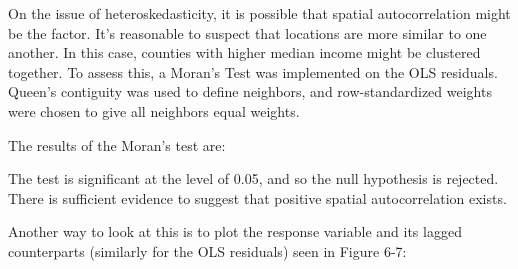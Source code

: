 \documentclass[
]{article}
\begin{document}
\newpage

On the issue of heteroskedasticity, it is possible that spatial
autocorrelation might be the factor. It's reasonable to suspect that
locations are more similar to one another. In this case, counties with
higher median income might be clustered together. To assess this, a
Moran's Test was implemented on the OLS residuals. Queen's contiguity
was used to define neighbors, and row-standardized weights were chosen
to give all neighbors equal weights.

The results of the Moran's test are:

\begin{table}[H]
\renewcommand{\arraystretch}{1.3} %
\setlength{\tabcolsep}{12pt} %
\centering
\caption{Global OLS Residual Moran's I Test Results}
\label{tab:global_ols_morans_i}
\end{table}

The test is significant at the level of 0.05, and so the null hypothesis
is rejected. There is sufficient evidence to suggest that positive
spatial autocorrelation exists.

Another way to look at this is to plot the response variable and its
lagged counterparts (similarly for the OLS residuals) seen in Figure
6-7:
\end{document}
